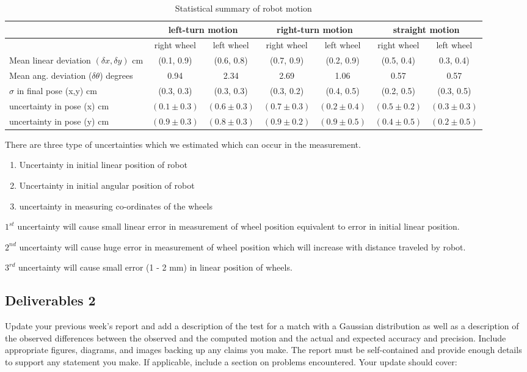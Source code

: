 \begin{table}[ht]
	\centering
	\begin{tabular}{| l | c | c | c | c | c | c |}
		\hline
		& \multicolumn{2}{c|}{left-turn motion} & \multicolumn{2}{c|}{ right-turn motion} & \multicolumn{2}{c|}{straight motion} \\
		\hline
		& right wheel & left wheel & right wheel & left wheel & right wheel & left wheel \\
		\hline
		Mean linear deviation $(\delta x, \delta y)$ cm & (0.1, 0.9) & (0.6, 0.8)
		& (0.7, 0.9) & (0.2, 0.9) & (0.5, 0.4) & 0.3, 0.4) \\
		\hline
		Mean ang. deviation ($\delta \theta$) degrees & 0.94 & 2.34 & 2.69 & 1.06 & 0.57 & 0.57 \\
		\hline
		$\sigma$ in final pose (x,y) cm & (0.3, 0.3) & (0.3, 0.3) & (0.3, 0.2) & (0.4, 0.5) & (0.2, 0.5) & (0.3, 0.5)\\
		\hline
		uncertainty in pose (x) cm & $(0.1 \pm 0.3)$ & $(0.6 \pm 0.3)$ & $(0.7 \pm 0.3)$ & $(0.2 \pm 0.4)$ & $(0.5 \pm 0.2)$ & $(0.3 \pm 0.3)$ \\
		uncertainty in pose (y) cm & $(0.9 \pm 0.3)$ & $(0.8 \pm 0.3)$ & $(0.9 \pm 0.2)$ & $(0.9 \pm 0.5)$ & $(0.4 \pm 0.5)$ & $(0.2 \pm 0.5)$ \\
		\hline
	\end{tabular}
	\caption{Statistical summary of robot motion}
	\label{stats}
\end{table}
There are three type of uncertainties which we estimated which can occur in the measurement. 
\begin{enumerate}
	\item Uncertainty in initial linear position of robot
	\item Uncertainty in initial angular position of robot
	\item uncertainty in measuring co-ordinates of the wheels
\end{enumerate}   

$1^{st}$ uncertainty will cause small linear error in measurement of wheel position equivalent to error in initial linear position.

$2^{nd}$ uncertainty will cause huge error in measurement of wheel position which will increase with distance traveled by robot. 

$3^{rd}$ uncertainty will cause small error (1 - 2 mm) in linear position of wheels.

\sectionLine
\subsection*{Deliverables 2}
Update your previous week’s report and add a description of the test for a match with a Gaussian distribution as well as a description of the observed differences between the observed and the computed motion and the actual and expected accuracy and precision. Include appropriate figures, diagrams, and images backing up any claims you make. The report must be self-contained and provide enough details to support any statement you make. If applicable, include a section on problems encountered. Your update should cover:

